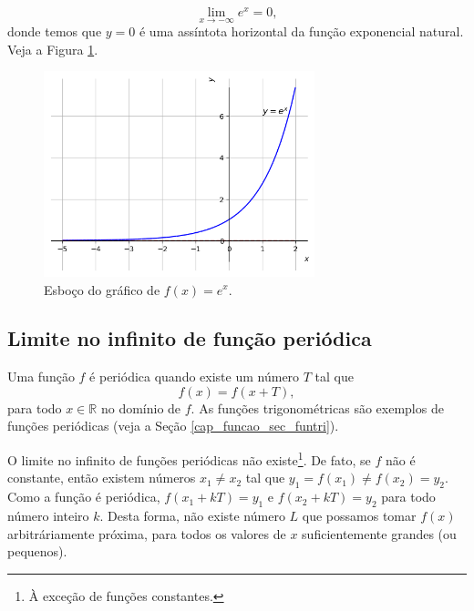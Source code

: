 \begin{ex}\label{ex:lim_exp_x-inf}
  \begin{equation}
    \lim_{x\to -\infty} e^x = 0,
  \end{equation}
  donde temos que $y=0$ é uma assíntota horizontal da função exponencial natural. Veja a Figura \ref{fig:lim_ex_xinf_exp}.

  \begin{figure}[H]
    \centering
    \includegraphics[width=0.7\textwidth]{./cap_lim/dados/fig_ex_xinf_exp/fig_ex_xinf_exp}
    \caption{Esboço do gráfico de $f(x)=e^x$.}
    \label{fig:lim_ex_xinf_exp}
  \end{figure}
\end{ex}

\subsection{Limite no infinito de função periódica}

Uma função $f$ é periódica quando existe um número $T$ tal que
\begin{equation}
  f(x) = f(x+T),
\end{equation}
para todo $x\in\mathbb{R}$ no domínio de $f$. As funções trigonométricas são exemplos de funções periódicas (veja a Seção \ref{cap_funcao_sec_funtri}).

O limite no infinito de funções periódicas não existe\footnote{À exceção de funções constantes.}. De fato, se $f$ não é constante, então existem números $x_1\neq x_2$ tal que $y_1=f(x_1)\neq f(x_2)=y_2$. Como a função é periódica, $f(x_1+kT)=y_1$ e $f(x_2+kT) = y_2$ para todo número inteiro $k$. Desta forma, não existe número $L$ que possamos tomar $f(x)$ arbitráriamente próxima, para todos os valores de $x$ suficientemente grandes (ou pequenos).

